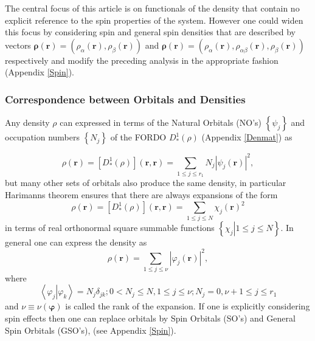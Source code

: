 \documentclass[aps,preprint]{revtex4}%
\begin{document}
The central focus of this article is on functionals of the density that
contain no explicit reference to the spin properties of the system. However
one could widen this focus by considering spin and general spin densities that
are described by vectors $\boldsymbol{\rho}\left(  \boldsymbol{r}\right)
=\left(  \rho_{\alpha}\left(  \boldsymbol{r}\right)  ,\rho_{\beta}\left(
\boldsymbol{r}\right)  \right)  $ and $\boldsymbol{\rho}\left(  \boldsymbol{r}%
\right)  =\left(  \rho_{\alpha}\left(  \boldsymbol{r}\right)  ,\rho
_{\alpha\beta}\left(  \boldsymbol{r}\right)  ,\rho_{\beta}\left(
\boldsymbol{r}\right)  \right)  $ respectively and modify the preceding
analysis in the appropriate fashion (Appendix \ref{Spin}).

\subsubsection{Correspondence between Orbitals and Densities\label{Orb_Den}}

Any density $\rho$ can expressed in terms of the Natural Orbitals (NO's)
$\left\{  \psi_{j}\right\}  $ and occupation numbers $\left\{  N_{j}\right\}
$ of the FORDO $D_{\ast}^{1}\left(  \rho\right)  $ (Appendix \ref{Denmat}) as%

\begin{equation}
\rho\left(  \boldsymbol{r}\right)  =\left[  D_{\ast}^{1}\left(  \rho\right)
\right]  \left(  \boldsymbol{r,r}\right)  =\sum_{1\leq j\leq r_{1}}%
N_{j}\left\vert \psi_{j}\left(  \boldsymbol{r}\right)  \right\vert
^{2},\label{NGSOexpan}%
\end{equation}
but many other sets of orbitals also produce the same density, in particular
Harimanns \cite{Harriman81} theorem ensures that there are always expansions
of the form
\begin{equation}
\rho\left(  \boldsymbol{r}\right)  =\left[  D_{\ast}^{1}\left(  \rho\right)
\right]  \left(  \boldsymbol{r,r}\right)  =\sum_{1\leq j\leq N}\chi_{j}\left(
\boldsymbol{r}\right)  ^{2}\label{Genexp}%
\end{equation}
in terms of real orthonormal square summable functions $\left\{  \left.
\chi_{j}\right\vert 1\leq j\leq N\right\}  $. In general one can express the
density as
\begin{equation}
\rho\left(  \boldsymbol{r}\right)  =\sum_{1\leq j\leq\nu}\left\vert
\varphi_{j}\left(  \boldsymbol{r}\right)  \right\vert ^{2},
\end{equation}
where
\[
\left\langle \left.  \varphi_{j}\right\vert \varphi_{k}\right\rangle
=N_{j}\delta_{jk};0<N_{j}\leq N,1\leq j\leq\nu;N_{j}=0,\nu+1\leq j\leq r_{1}%
\]
and $\nu\equiv\nu\left(  \boldsymbol{\varphi}\right)  $ is called the rank of
the expansion. If one is explicitly considering spin effects then one can
replace orbitals by Spin Orbitals (SO's) and General Spin Orbitals (GSO's),
(see Appendix \ref{Spin}).
\end{document}
